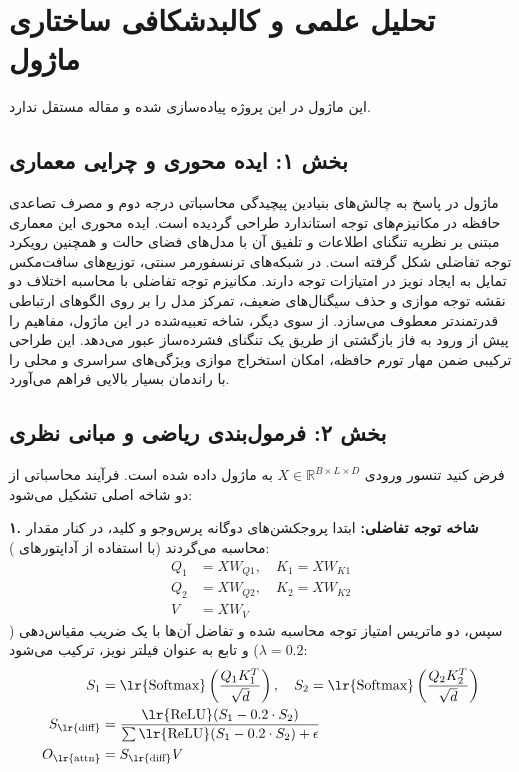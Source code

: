 \section{تحلیل علمی و کالبدشکافی ساختاری ماژول }

این ماژول در این پروژه پیاده‌سازی شده و مقاله مستقل ندارد.

\subsection*{بخش ۱: ایده محوری و چرایی معماری }
ماژول  در پاسخ به چالش‌های بنیادین پیچیدگی محاسباتی درجه دوم و مصرف تصاعدی حافظه در مکانیزم‌های توجه استاندارد طراحی گردیده است. ایده محوری این معماری مبتنی بر نظریه تنگنای اطلاعات  و تلفیق آن با مدل‌های فضای حالت  و همچنین رویکرد توجه تفاضلی  شکل گرفته است. در شبکه‌های ترنسفورمر سنتی، توزیع‌های سافت‌مکس تمایل به ایجاد نویز در امتیازات توجه دارند. مکانیزم توجه تفاضلی با محاسبه اختلاف دو نقشه توجه موازی و حذف سيگنال‌های ضعیف، تمرکز مدل را بر روی الگوهای ارتباطی قدرتمندتر معطوف می‌سازد. از سوی دیگر، شاخه  تعبیه‌شده در این ماژول، مفاهیم را پیش از ورود به فاز بازگشتی از طریق یک تنگنای فشرده‌ساز عبور می‌دهد. این طراحی ترکیبی  ضمن مهار تورم حافظه، امکان استخراج موازی ویژگی‌های سراسری و محلی را با راندمان بسیار بالایی فراهم می‌آورد.

\subsection*{بخش ۲: فرمول‌بندی ریاضی و مبانی نظری }
فرض کنید تنسور ورودی $X \in \mathbb{R}^{B \times L \times D}$ به ماژول داده شده است. فرآیند محاسباتی از دو شاخه اصلی تشکیل می‌شود:

\textbf{۱. شاخه توجه تفاضلی:}
ابتدا پروجکشن‌های دوگانه پرس‌وجو و کلید، در کنار مقدار محاسبه می‌گردند (با استفاده از آداپتورهای ):
\begin{align}
    Q_1 &= X W_{Q1}, \quad K_1 = X W_{K1} \\
    Q_2 &= X W_{Q2}, \quad K_2 = X W_{K2} \\
    V &= X W_V
\end{align}
سپس، دو ماتریس امتیاز توجه محاسبه شده و تفاضل آن‌ها با یک ضریب مقیاس‌دهی ($\lambda = 0.2$) و تابع  به عنوان فیلتر نویز، ترکیب می‌شود:
\begin{align}
    S_1 &= \text{\lr{Softmax}}\left(\frac{Q_1 K_1^T}{\sqrt{d}}\right), \quad S_2 = \text{\lr{Softmax}}\left(\frac{Q_2 K_2^T}{\sqrt{d}}\right) \\
    S_{\text{\lr{diff}}} &= \frac{\text{\lr{ReLU}}(S_1 - 0.2 \cdot S_2)}{\sum \text{\lr{ReLU}}(S_1 - 0.2 \cdot S_2) + \epsilon} \\
    O_{\text{\lr{attn}}} &= S_{\text{\lr{diff}}} V
\end{align}

